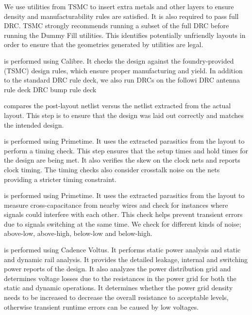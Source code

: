 \smallskip
\begin{cbxlist}{1.5em}{0em}{0.5em}

  \item {} We use utilities from
     TSMC to insert extra metals and other layers to ensure density and
     manufacturability rules are satisfied. It is also required to pass
     full DRC. TSMC strongly recommends running a subset of the full DRC
     before running the Dummy Fill utilities. This identifies potentially
     unfriendly layouts in order to ensure that the geometries generated
     by utilities are legal.

  \item {} is performed using Calibre. It
     checks the design against the foundry-provided (TSMC) design rules,
     which ensure proper manufacturing and yield. In addition to the
     standard DRC rule deck, we also run DRCs on the followi DRC antenna
     rule deck DRC bump rule deck

  \item {} compares the post-layout netlist
     versus the netlist extracted from the actual layout. This step is to
     ensure that the design was laid out correctly and matches the
     intended design.

  \item {} is performed using Primetime. It uses the
     extracted parasitics from the layout to perform a timing check. This
     step ensures that the setup times and hold times for the design are
     being met. It also verifies the skew on the clock nets and reports
     clock timing. The timing checks also consider crosstalk noise on the
     nets providing a stricter timing constraint.

  \item {} is performed using Primetime. It
     uses the extracted parasitics from the layout to measure
     cross-capacitance from nearby wires and check for instances where
     signals could interfere with each other. This check helps prevent
     transient errors due to signals switching at the same time. We check
     for different kinds of noise; above-low, above-high, below-low and
     below-high.

  \item {} is performed using Cadence Voltus. It performs
     static power analysis and static and dynamic rail analysis. It
     provides the detailed leakage, internal and switching power reports
     of the design. It also analyzes the power distribution grid and
     determines voltage losses due to the resistances in the power grid
     for both the static and dynamic operations. It determines whether
     the power grid density needs to be increased to decrease the overall
     resistance to acceptable levels, otherwise transient runtime errors
     can be caused by low voltages.


\end{cbxlist}
